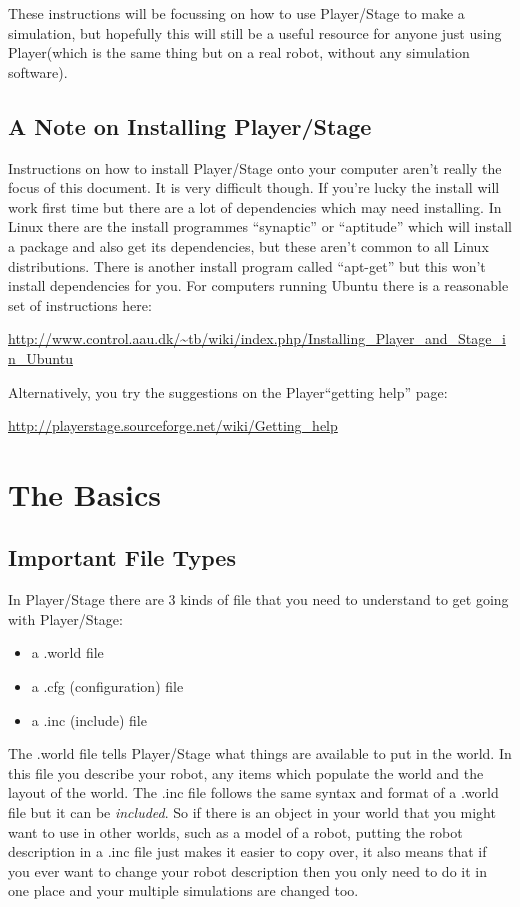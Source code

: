 \documentclass[a4paper]{article}
\newcommand{\plst}{Player/Stage\xspace}
\newcommand{\pl}{Player\xspace}
\begin{document}
These instructions will be focussing on how to use \plst to make a simulation, but hopefully this will still be a useful resource for anyone just using \pl (which is the same thing but on a real robot, without any simulation software).

\subsection{A Note on Installing \plst}
Instructions on how to install \plst onto your computer aren't really the focus of this document. It is very difficult though. If you're lucky the install will work first time but there are a lot of dependencies which may need installing. In Linux there are the install programmes ``synaptic'' or ``aptitude'' which will install a package and also get its dependencies, but these aren't common to all Linux distributions. There is another install program called ``apt-get'' but this won't install dependencies for you. For computers running Ubuntu there is a reasonable set of instructions here:
\begin{center}
\url{http://www.control.aau.dk/~tb/wiki/index.php/Installing_Player_and_Stage_in_Ubuntu}
\end{center}
Alternatively, you try the suggestions on the \pl ``getting help'' page:
\begin{center}
	\url{http://playerstage.sourceforge.net/wiki/Getting_help}
\end{center}

\section{The Basics}

\subsection{Important File Types}
In \plst there are 3 kinds of file that you need to understand to get going with \plst:
\begin{itemize}
	\item a .world file
	\item a .cfg (configuration) file
	\item a .inc (include) file
\end{itemize}
The .world file tells \plst what things are available to put in the world. In this file you describe your robot, any items which populate the world and the layout of the world. The .inc file follows the same syntax and format of a .world file but it can be \emph{included}. So if there is an object in your world that you might want to use in other worlds, such as a model of a robot, putting the robot description in a .inc file just makes it easier to copy over, it also means that if you ever want to change your robot description then you only need to do it in one place and your multiple simulations are changed too.
\end{document}
